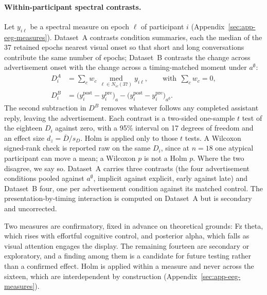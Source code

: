 \documentclass[english]{article}
\begin{document}
\paragraph{Within-participant spectral contrasts.}
Let \(y_{i\ell}\) be a spectral measure on epoch \(\ell\) of participant \(i\) (Appendix~\ref{sec:app-eeg-measures}). Dataset~A contrasts condition summaries, each the median of the 37 retained epochs nearest visual onset so that short and long conversations contribute the same number of epochs; Dataset~B contrasts the change across advertisement onset with the change across a timing-matched moment under \(a^{\emptyset}\):
\begin{equation}
\begin{aligned}
D^{A}_{i}&=\sum_{c}w_{c}\,\operatorname*{med}_{\ell\in N_{ic}(37)} y_{i\ell},
\qquad\text{with}\ \ \sum_{c}w_{c}=0,\\[3pt]
D^{B}_{i}&=\bigl(y^{\mathrm{post}}_{i}-y^{\mathrm{pre}}_{i}\bigr)_{a}
-\bigl(y^{\mathrm{post}}_{i}-y^{\mathrm{pre}}_{i}\bigr)_{a^{\emptyset}}.
\end{aligned}
\end{equation}
The second subtraction in \(D^{B}\) removes whatever follows any completed assistant reply, leaving the advertisement. Each contrast is a two-sided one-sample \(t\) test of the eighteen \(D_{i}\) against zero, with a 95\% interval on 17 degrees of freedom and an effect size \(d_{z}=\overline{D}/s_{D}\). Holm is applied only to those \(t\) tests. A Wilcoxon signed-rank check is reported raw on the same \(D_{i}\), since at \(n=18\) one atypical participant can move a mean; a Wilcoxon \(p\) is not a Holm \(p\). Where the two disagree, we say so. Dataset~A carries three contrasts (the four advertisement conditions pooled against \(a^{\emptyset}\), implicit against explicit, early against late) and Dataset~B four, one per advertisement condition against its matched control. The presentation-by-timing interaction is computed on Dataset~A but is secondary and uncorrected.

Two measures are confirmatory, fixed in advance on theoretical grounds: Fz theta, which rises with effortful cognitive control, and posterior alpha, which falls as visual attention engages the display. The remaining fourteen are secondary or exploratory, and a finding among them is a candidate for future testing rather than a confirmed effect. Holm is applied within a measure and never across the sixteen, which are interdependent by construction (Appendix~\ref{sec:app-eeg-measures}).
\end{document}
